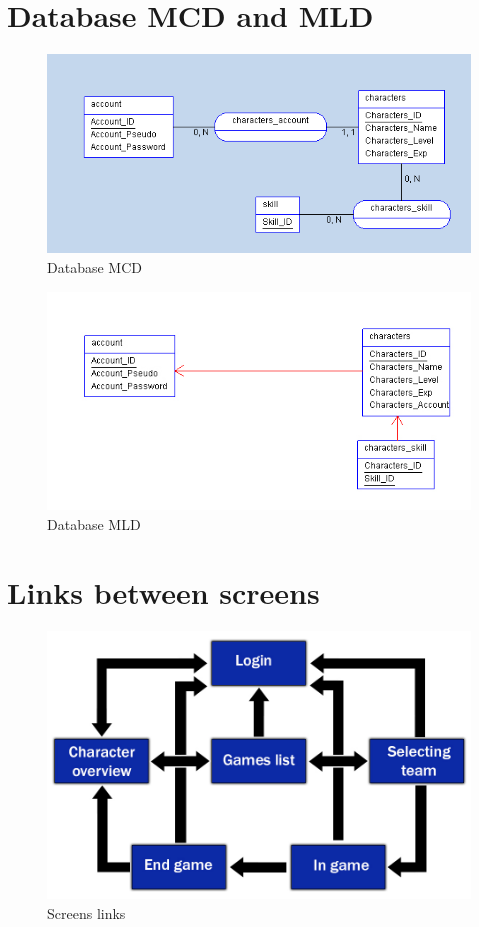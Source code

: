 \documentclass{scrreprt}
\begin{document}
\chapter{Database MCD and MLD}
		  \begin{figure}[h]		
		  \begin{center}
		  \includegraphics[scale=0.5]{mcd.png}
		  \end{center}
		  \caption{Database MCD}
		  \end{figure}

		  \begin{figure}[h]		
		  \begin{center}
		  \includegraphics[scale=0.5]{mld.jpg}
		  \end{center}
		  \caption{Database MLD}
		  \end{figure}

\chapter{Links between screens}
		  \begin{figure}[h]		
		  \begin{center}
		  \includegraphics[scale=0.4]{screen.jpg}
		  \end{center}
		  \caption{Screens links}
		  \end{figure}

					
\end{document}
